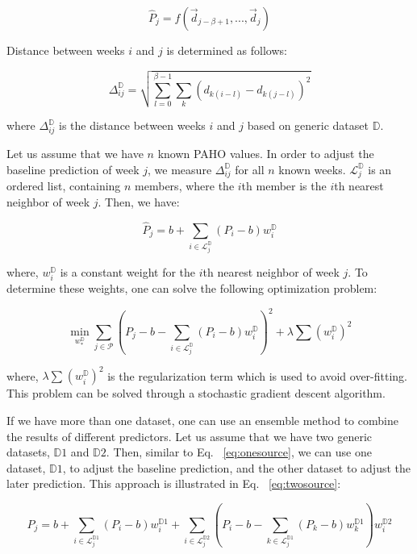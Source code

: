 \begin{equation}
\hat{P}_{j} = \mathit{f}(\vec{d}_{j-\beta+1},...,\vec{d}_{j})
\end{equation}

Distance between weeks $i$ and $j$ is determined as follows:

\begin{equation}
\Delta_{ij}^\mathbb{D} = \sqrt{\sum_{l=0}^{\beta-1} \sum_{k} (d_{k(i-l)}-d_{k(j-l)})^2}
\end{equation}

where $\Delta_{ij}^\mathbb{D}$ is the distance between weeks $i$ and $j$ based on generic dataset $\mathbb{D}$.

Let us assume that we have $n$ known PAHO values. In order to adjust the baseline prediction of week $j$, we measure $\Delta_{ij}^\mathbb{D}$ for all $n$ known weeks. $\mathcal{L}_{j}^\mathbb{D}$ is an ordered list, containing $n$ members, where the $i$th member is the $i$th nearest neighbor of week $j$. Then, we have:

\begin{equation}
\hat{P}_{j} = b + \sum_{i \in \mathcal{L}_{j}^\mathbb{D}}{} (P_i - b)w_{i}^\mathbb{D}
\label{eq:onesource}
\end{equation}

where, $w_{i}^\mathbb{D}$ is a constant weight for the $i$th nearest neighbor of week $j$. To determine these weights, one can solve the following optimization problem:

\begin{equation}
\min_{w_{*}^\mathbb{D}} \sum_{j \in \mathcal{P}} {(P_j - b - \sum_{i \in \mathcal{L}_{j}^\mathbb{D}}{} (P_i - b)w_{i}^\mathbb{D})^2} + \lambda \sum_{}{}{{(w_{i}^\mathbb{D})}^2}
\end{equation}

where, $\lambda \sum_{}{}{{(w_{i}^\mathbb{D})}^2}$ is the regularization term which is used to avoid over-fitting. This problem can be solved through a stochastic gradient descent algorithm.

If we have more than one dataset, one can use an ensemble method to combine the results of different predictors. Let us assume that we have two generic datasets, $\mathbb{D}1$ and $\mathbb{D}2$. Then, similar to Eq. ~\ref{eq:onesource}, we can use one dataset, $\mathbb{D}1$, to adjust the baseline prediction, and the other dataset to adjust the later prediction. This approach is illustrated in Eq. ~\ref{eq:twosource}:

\begin{equation}
\hat{P}_{j} = b + \sum_{i \in \mathcal{L}_{j}^{\mathbb{D}1}}{} (P_i - b)w_{i}^{\mathbb{D}1} + \sum_{i \in \mathcal{L}_{j}^{\mathbb{D}2}}{} (P_i - b - \sum_{k \in \mathcal{L}_{j}^{\mathbb{D}1}}{} (P_k - b)w_{k}^{\mathbb{D}1})w_{i}^{\mathbb{D}2}
\label{eq:twosource}
\end{equation}

